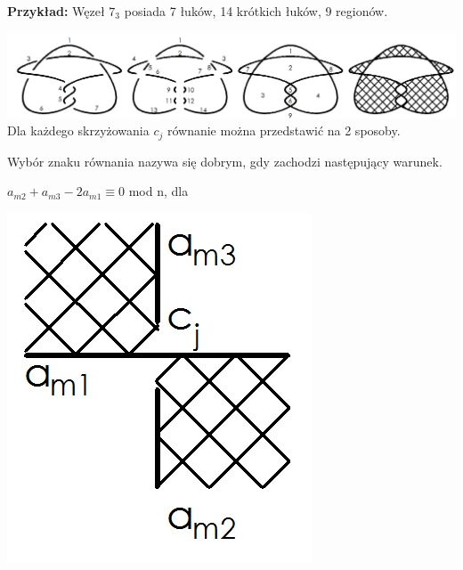 \textbf{Przykład:} Węzeł $7_{3}$ posiada 7 łuków, 14 krótkich łuków, 9 regionów.

			\includegraphics[scale=0.3]{2/Obrazy/ArcRegion3} \\


Dla każdego skrzyżowania $c_{j}$ równanie można przedstawić na 2 sposoby. 
\begin{definicja}
Wybór znaku równania nazywa się dobrym, gdy zachodzi następujący warunek. 
\end{definicja}

	\begin{minipage}{0.5\textwidth}
$a_{m2}+a_{m3}-2a_{m1} \equiv 0$ mod n, dla \\	
	\begin{center}
			\includegraphics[scale=0.3]{2/Obrazy/Cros+}
	\end{center}
	\end{minipage}
